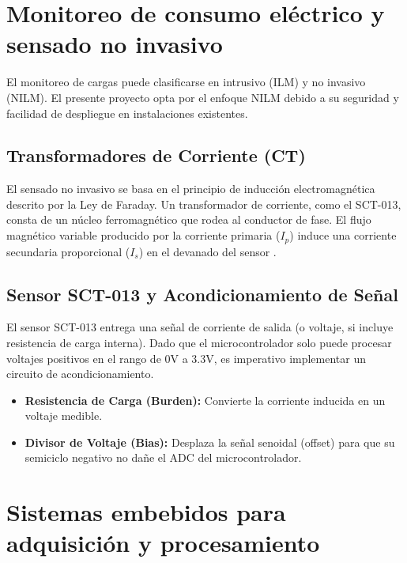 ﻿\documentclass[12pt,openright,oneside]{report}
\theoremstyle{mytheoremstyle}
\theoremstyle{mytheoremstyle}
\theoremstyle{myproblemstyle}
\begin{document}
\section{Monitoreo de consumo eléctrico y sensado no invasivo}
\label{sec:monitoreo_sensado}

El monitoreo de cargas puede clasificarse en intrusivo (ILM) y no invasivo (NILM). El presente proyecto opta por el enfoque NILM debido a su seguridad y facilidad de despliegue en instalaciones existentes.

\subsection{Transformadores de Corriente (CT)}
El sensado no invasivo se basa en el principio de inducción electromagnética descrito por la Ley de Faraday. Un transformador de corriente, como el SCT-013, consta de un núcleo ferromagnético que rodea al conductor de fase. El flujo magnético variable producido por la corriente primaria ($I_p$) induce una corriente secundaria proporcional ($I_s$) en el devanado del sensor \cite{ziegler2009current}.

\subsection{Sensor SCT-013 y Acondicionamiento de Señal}
El sensor SCT-013 entrega una señal de corriente de salida (o voltaje, si incluye resistencia de carga interna). Dado que el microcontrolador solo puede procesar voltajes positivos en el rango de 0V a 3.3V, es imperativo implementar un circuito de acondicionamiento.
\begin{itemize}
    \item \textbf{Resistencia de Carga (Burden):} Convierte la corriente inducida en un voltaje medible.
    \item \textbf{Divisor de Voltaje (Bias):} Desplaza la señal senoidal (offset) para que su semiciclo negativo no dañe el ADC del microcontrolador.
\end{itemize}


\section{Sistemas embebidos para adquisición y procesamiento}
\label{sec:sistemas_embebidos}
\end{document}

